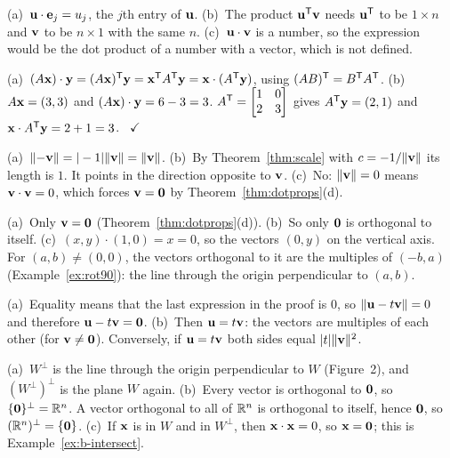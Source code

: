 \documentclass[11pt]{article}
\begin{document}
\begin{description}[leftmargin=0pt,itemsep=5pt]
  \item[Pause and think \ref{think:dotstruct}.] (a)~$\mathbf{u}\cdot\mathbf{e}_j=u_j$, the $j$th entry of $\mathbf{u}$. (b)~The product $\mathbf{u}^{\mathsf T}\mathbf{v}$ needs $\mathbf{u}^{\mathsf T}$ to be $1\times n$ and $\mathbf{v}$ to be $n\times1$ with the same $n$. (c)~$\mathbf{u}\cdot\mathbf{v}$ is a number, so the expression would be the dot product of a number with a vector, which is not defined.
  \item[Pause and think \ref{think:movemat}.] (a)~$(A\mathbf{x})\cdot\mathbf{y}=(A\mathbf{x})^{\mathsf T}\mathbf{y}=\mathbf{x}^{\mathsf T} A^{\mathsf T}\mathbf{y}=\mathbf{x}\cdot(A^{\mathsf T}\mathbf{y})$, using $(AB)^{\mathsf T}=B^{\mathsf T} A^{\mathsf T}$. (b)~$A\mathbf{x}=(3,3)$ and $(A\mathbf{x})\cdot\mathbf{y}=6-3=3$. $A^{\mathsf T}=\begin{bmatrix}1&0\\2&3\end{bmatrix}$ gives $A^{\mathsf T}\mathbf{y}=(2,1)$ and $\mathbf{x}\cdot A^{\mathsf T}\mathbf{y}=2+1=3$. \ $\checkmark$
  \item[Pause and think \ref{think:unitthink}.] (a)~$\lVert-\mathbf{v}\rVert=|-1|\lVert\mathbf{v}\rVert=\lVert\mathbf{v}\rVert$. (b)~By Theorem~\ref{thm:scale} with $c=-1/\lVert\mathbf{v}\rVert$ its length is $1$. It points in the direction opposite to $\mathbf{v}$. (c)~No: $\lVert\mathbf{v}\rVert=0$ means $\mathbf{v}\cdot\mathbf{v}=0$, which forces $\mathbf{v}=\mathbf{0}$ by Theorem~\ref{thm:dotprops}(d).
  \item[Pause and think \ref{think:orthzero}.] (a)~Only $\mathbf{v}=\mathbf{0}$ (Theorem~\ref{thm:dotprops}(d)). (b)~So only $\mathbf{0}$ is orthogonal to itself. (c)~$(x,y)\cdot(1,0)=x=0$, so the vectors $(0,y)$ on the vertical axis. For $(a,b)\neq(0,0)$, the vectors orthogonal to it are the multiples of $(-b,a)$ (Example~\ref{ex:rot90}): the line through the origin perpendicular to $(a,b)$.
  \item[Pause and think \ref{think:csthink}.] (a)~Equality means that the last expression in the proof is $0$, so $\lVert\mathbf{u}-t\mathbf{v}\rVert=0$ and therefore $\mathbf{u}-t\mathbf{v}=\mathbf{0}$. (b)~Then $\mathbf{u}=t\mathbf{v}$: the vectors are multiples of each other (for $\mathbf{v}\neq\mathbf{0}$). Conversely, if $\mathbf{u}=t\mathbf{v}$ both sides equal $|t|\lVert\mathbf{v}\rVert^2$.
  \item[Pause and think \ref{think:perpthink}.] (a)~$W^{\perp}$ is the line through the origin perpendicular to $W$ (Figure~2), and $(W^{\perp})^{\perp}$ is the plane $W$ again. (b)~Every vector is orthogonal to $\mathbf{0}$, so $\{\mathbf{0}\}^{\perp}=\mathbb{R}^n$. A vector orthogonal to all of $\mathbb{R}^n$ is orthogonal to itself, hence $\mathbf{0}$, so $(\mathbb{R}^n)^{\perp}=\{\mathbf{0}\}$. (c)~If $\mathbf{x}$ is in $W$ and in $W^{\perp}$, then $\mathbf{x}\cdot\mathbf{x}=0$, so $\mathbf{x}=\mathbf{0}$; this is Example~\ref{ex:b-intersect}.

\end{description}
\end{document}
